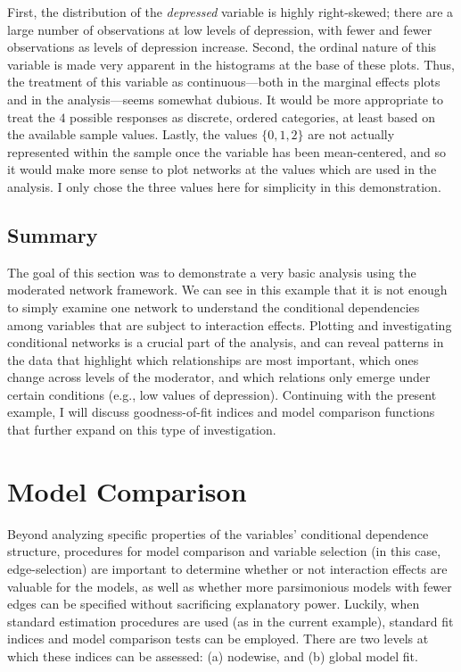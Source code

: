 First, the distribution of the \textit{depressed} variable is highly right-skewed; there are a large number of observations at low levels of depression, with fewer and fewer observations as levels of depression increase. Second, the ordinal nature of this variable is made very apparent in the histograms at the base of these plots. Thus, the treatment of this variable as continuous---both in the marginal effects plots and in the analysis---seems somewhat dubious. It would be more appropriate to treat the $4$ possible responses as discrete, ordered categories, at least based on the available sample values. Lastly, the values $\{0,1,2\}$ are not actually represented within the sample once the variable has been mean-centered, and so it would make more sense to plot networks at the values which are used in the analysis. I only chose the three values here for simplicity in this demonstration.

\subsection{Summary}
The goal of this section was to demonstrate a very basic analysis using the moderated network framework. We can see in this example that it is not enough to simply examine one network to understand the conditional dependencies among variables that are subject to interaction effects. Plotting and investigating conditional networks is a crucial part of the analysis, and can reveal patterns in the data that highlight which relationships are most important, which ones change across levels of the moderator, and which relations only emerge under certain conditions (e.g., low values of depression). Continuing with the present example, I will discuss goodness-of-fit indices and model comparison functions that further expand on this type of investigation.

\section{Model Comparison}
Beyond analyzing specific properties of the variables' conditional dependence structure, procedures for model comparison and variable selection (in this case, edge-selection) are important to determine whether or not interaction effects are valuable for the models, as well as whether more parsimonious models with fewer edges can be specified without sacrificing explanatory power. Luckily, when standard estimation procedures are used (as in the current example), standard fit indices and model comparison tests can be employed. There are two levels at which these indices can be assessed: (a) nodewise, and (b) global model fit. 

